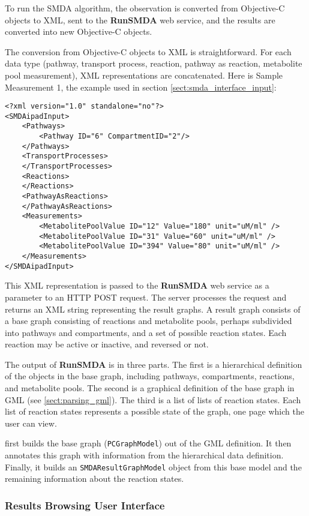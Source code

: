To run the SMDA algorithm, the observation is converted from Objective-C objects
to XML, sent to the \textbf{RunSMDA} web service, and the results are converted
into new Objective-C objects.

The conversion from Objective-C objects to XML is straightforward. For each data
type (pathway, transport process, reaction, pathway as reaction, metabolite
pool measurement), XML representations are concatenated. Here is Sample
Measurement 1, the example used in section \ref{sect:smda_interface_input}:

\begin{lstlisting}
<?xml version="1.0" standalone="no"?>
<SMDAipadInput>
	<Pathways>
		<Pathway ID="6" CompartmentID="2"/>		
	</Pathways>  
	<TransportProcesses>		
	</TransportProcesses>  
	<Reactions>		
	</Reactions>  	
	<PathwayAsReactions>
	</PathwayAsReactions>  	
	<Measurements>
		<MetabolitePoolValue ID="12" Value="180" unit="uM/ml" />
		<MetabolitePoolValue ID="31" Value="60" unit="uM/ml" />
		<MetabolitePoolValue ID="394" Value="80" unit="uM/ml" />
	</Measurements>
</SMDAipadInput>
\end{lstlisting}

This XML representation is passed to the \textbf{RunSMDA} web service as a
parameter to an HTTP POST request. The server processes the request and returns
an XML string representing the result graphs. A result graph consists of a base
graph consisting of reactions and metabolite pools, perhaps subdivided into
pathways and compartments, and a set of possible reaction states. Each reaction
may be active or inactive, and reversed or not.

The output of \textbf{RunSMDA} is in three parts. The first is a hierarchical
definition of the objects in the base graph, including pathways, compartments,
reactions, and metabolite pools. The second is a graphical definition of the
base graph in GML (see \ref{sect:parsing_gml}). The third is a list of lists of
reaction states. Each list of reaction states represents a possible state of the
graph, one page which the user can view.

\mawapp first builds the base graph (\texttt{PCGraphModel}) out of the GML
definition. It then annotates this graph with information from the hierarchical
data definition. Finally, it builds an \texttt{SMDAResultGraphModel} object from
this base model and the remaining information about the reaction states.

\subsubsection{Results Browsing User Interface}
\label{sect:smda_results_browsing}

